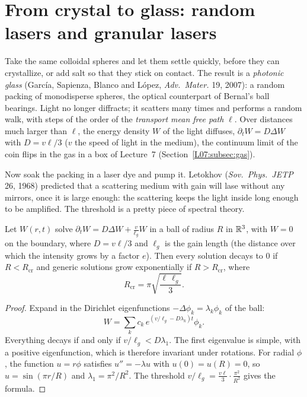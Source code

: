 \section{From crystal to glass: random lasers and granular lasers}
\label{PHYS:sec:laser}

Take the same colloidal spheres and let them settle quickly, before they can crystallize, or add salt so
that they stick on contact. The result is a \emph{photonic glass} (Garc\'ia, Sapienza, Blanco and L\'opez,
\emph{Adv.\ Mater.} 19, 2007): a random packing of monodisperse spheres, the optical counterpart of Bernal's
ball bearings. Light no longer diffracts; it scatters many times and performs a random walk, with steps
of the order of the \emph{transport mean free path} $\ell$. Over distances much larger than $\ell$, the
energy density $W$ of the light diffuses, $\partial_tW=D\Delta W$ with $D=v\ell/3$ ($v$ the speed of light in
the medium), the continuum limit of the coin flips in the gas in a box of Lecture~7
(Section~\ref{L07:subsec:gas}).

Now soak the packing in a laser dye and pump it. Letokhov (\emph{Sov.\ Phys.\ JETP} 26, 1968) predicted
that a scattering medium with gain will lase without any mirrors, once it is large enough: the
scattering keeps the light inside long enough to be amplified. The threshold is a pretty piece of
spectral theory.

\begin{proposition}\label{PHYS:prop:letokhov}
Let $W(r,t)$ solve $\partial_tW=D\Delta W+\frac v{\ell_g}W$ in a ball of radius $R$ in $\mathbb{R}^3$, with $W=0$ on the
boundary, where $D=v\ell/3$ and $\ell_g$ is the gain length (the distance over which the intensity grows
by a factor $e$). Then every solution decays to $0$ if $R<R_{\mathrm{cr}}$ and generic solutions grow
exponentially if $R>R_{\mathrm{cr}}$, where
\[
  R_{\mathrm{cr}}=\pi\sqrt{\frac{\ell\,\ell_g}3}.
\]
\end{proposition}

\begin{proof}
Expand in the Dirichlet eigenfunctions $-\Delta\phi_k=\lambda_k\phi_k$ of the ball:
\[
  W=\sum_kc_k\,e^{(v/\ell_g-D\lambda_k)t}\phi_k .
\]
Everything decays if and only if $v/\ell_g<D\lambda_1$. The first
eigenvalue is simple, with a positive eigenfunction, which is therefore invariant under rotations. For
radial $\phi$, the function $u=r\phi$ satisfies $u''=-\lambda u$ with $u(0)=u(R)=0$, so $u=\sin(\pi r/R)$ and
$\lambda_1=\pi^2/R^2$. The threshold $v/\ell_g=\frac{v\ell}3\cdot\frac{\pi^2}{R^2}$ gives the formula.
\end{proof}

